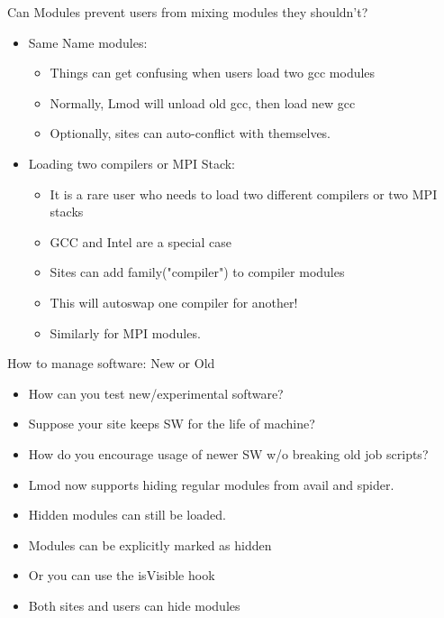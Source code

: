\documentclass{beamer}
\begin{document}
\begin{frame}{Can Modules prevent users from mixing modules they shouldn't?}
  \begin{itemize}
      \item Same Name modules:
      \begin{itemize}
        \item Things can get confusing when users load two gcc modules
        \item Normally, Lmod will unload old gcc, then load new gcc
        \item Optionally, sites can auto-conflict with themselves.
      \end{itemize}
    \item Loading two compilers or MPI Stack:
      \begin{itemize}
        \item It is a rare user who needs to load two different
          compilers or two MPI stacks
        \item GCC and Intel are a special case
        \item Sites can add family("compiler") to compiler modules
        \item This will autoswap one compiler for another!
        \item Similarly for MPI modules.
      \end{itemize}
  \end{itemize}
\end{frame}

\begin{frame}{How to manage software: New or Old}
  \begin{itemize}
    \item How can you test new/experimental software?
    \item Suppose your site keeps SW for the life of machine?
    \item How do you encourage usage of newer SW w/o breaking old job
      scripts?
    \item Lmod now supports hiding regular modules from avail and
      spider.
    \item Hidden modules can still be loaded.
    \item Modules can be explicitly marked as hidden
    \item Or you can use the isVisible hook
    \item Both sites and users can hide modules
  \end{itemize}
\end{frame}
\end{document}

